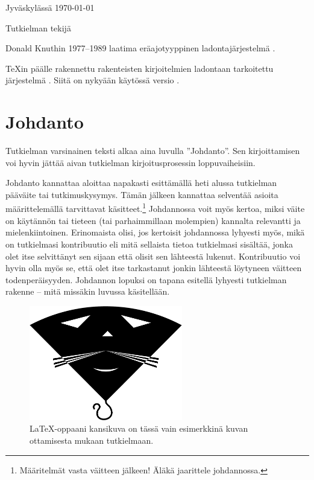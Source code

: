 \documentclass[utf8]{gradu3}
\begin{document}
Jyväskylässä \today

\bigskip

Tutkielman tekijä

\begin{thetermlist}
\item[\TeX] Donald Knuthin 1977--1989 laatima eräajotyyppinen
  ladontajärjestelmä \parencite[ks.][]{knuth86:_texbook}. 
\item[\LaTeX] \TeX in päälle rakennettu rakenteisten kirjoitelmien
  ladontaan tarkoitettu järjestelmä \parencite[ks.][]{lamport94:_latex}.
  Siitä on nykyään käytössä versio \LaTeXe.
\end{thetermlist}

\mainmatter

\chapter{Johdanto}

Tutkielman varsinainen teksti alkaa aina luvulla ''Johdanto''.  Sen
kirjoittamisen voi hyvin jättää aivan tutkielman kirjoitusprosessin
loppuvaiheisiin.

Johdanto kannattaa aloittaa napakasti esittämällä heti alussa
tutkielman pääväite tai tutkimuskysymys.  Tämän jälkeen kannattaa
selventää asioita määrittelemällä tarvittavat
käsitteet.\footnote{Määritelmät vasta väitteen jälkeen! Äläkä
  jaarittele johdannossa.}  Johdannossa voit myös kertoa, miksi väite
on käytännön tai tieteen (tai parhaimmillaan molempien) kannalta
relevantti ja mielenkiintoinen.  Erinomaista olisi, jos kertoisit
johdannossa lyhyesti myös, mikä on tutkielmasi kontribuutio eli mitä
sellaista tietoa tutkielmasi sisältää, jonka olet itse selvittänyt sen
sijaan että olisit sen lähteestä lukenut.  Kontribuutio voi hyvin olla
myös se, että olet itse tarkastanut jonkin lähteestä löytyneen
väitteen todenperäisyyden.  Johdannon lopuksi on tapana esitellä
lyhyesti tutkielman rakenne -- mitä missäkin luvussa käsitellään.

\begin{figure}[h]\centering
  \includegraphics[height=5cm,keepaspectratio]{opus-kissa}
  \caption[\LaTeX-oppaani \parencite{kaijanaho03:_latex_ams_latex}
  kansikuva]{\LaTeX-oppaani \parencite{kaijanaho03:_latex_ams_latex}
    kansikuva on tässä vain esimerkkinä kuvan ottamisesta mukaan
    tutkielmaan.}
  \label{fig:opus-kissa}
\end{figure}
\end{document}
